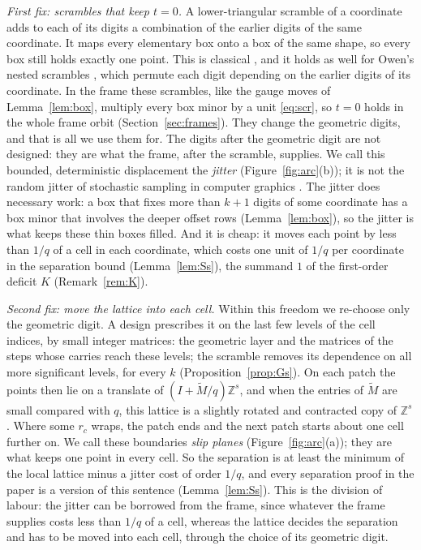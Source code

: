 \documentclass[11pt]{amsart}
\theoremstyle{definition}
\theoremstyle{plain}
\newcommand{\Z}{\mathbb{Z}}
\begin{document}
\emph{First fix: scrambles that keep $t=0$.} A lower-triangular scramble of a coordinate adds to each of its digits a combination of the earlier digits of the same coordinate. It maps every elementary box onto a box of the same shape, so every box still holds exactly one point. This is classical \cite{Mat98,Tez95,DP10}, and it holds as well for Owen's nested scrambles \cite{Owe95}, which permute each digit depending on the earlier digits of its coordinate. In the frame these scrambles, like the gauge moves of Lemma~\ref{lem:box}, multiply every box minor by a unit \eqref{eq:scr}, so $t=0$ holds in the whole frame orbit (Section~\ref{sec:frames}). They change the geometric digits, and that is all we use them for. The digits after the geometric digit are not designed: they are what the frame, after the scramble, supplies. We call this bounded, deterministic displacement the \emph{jitter} (Figure~\ref{fig:arc}(b)); it is not the random jitter of stochastic sampling in computer graphics \cite{Coo86}. The jitter does necessary work: a box that fixes more than $k+1$ digits of some coordinate has a box minor that involves the deeper offset rows (Lemma~\ref{lem:box}), so the jitter is what keeps these thin boxes filled. And it is cheap: it moves each point by less than $1/q$ of a cell in each coordinate, which costs one unit of $1/q$ per coordinate in the separation bound (Lemma~\ref{lem:Ss}), the summand $1$ of the first-order deficit $K$ (Remark~\ref{rem:K}).

\emph{Second fix: move the lattice into each cell.} Within this freedom we re-choose only the geometric digit. A design prescribes it on the last few levels of the cell indices, by small integer matrices: the geometric layer and the matrices of the steps whose carries reach these levels; the scramble removes its dependence on all more significant levels, for every $k$ (Proposition~\ref{prop:Gs}). On each patch the points then lie on a translate of $(I+\tilde M/q)\Z^s$, and when the entries of $\tilde M$ are small compared with $q$, this lattice is a slightly rotated and contracted copy of $\Z^s$. Where some $r_c$ wraps, the patch ends and the next patch starts about one cell further on. We call these boundaries \emph{slip planes} (Figure~\ref{fig:arc}(a)); they are what keeps one point in every cell. So the separation is at least the minimum of the local lattice minus a jitter cost of order $1/q$, and every separation proof in the paper is a version of this sentence (Lemma~\ref{lem:Ss}). This is the division of labour: the jitter can be borrowed from the frame, since whatever the frame supplies costs less than $1/q$ of a cell, whereas the lattice decides the separation and has to be moved into each cell, through the choice of its geometric digit.
\end{document}
